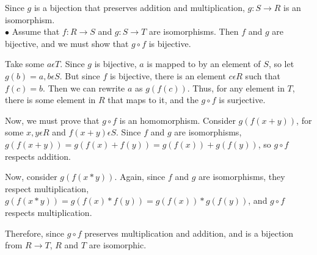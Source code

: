 \documentclass[a4paper,11pt]{article}
\begin{document}
Since $g$ is a bijection that preserves addition and multiplication, $g: S \rightarrow R$ is an isomorphism.\\

$\bullet$ Assume that $f: R \rightarrow S$ and $g: S \rightarrow T$ are isomorphisms. Then $f$ and $g$ are bijective, and we must show that $g \circ f$ is bijective.

Take some $a \epsilon T$. Since $g$ is bijective, $a$ is mapped to by an element of $S$, so let $g(b) = a, b \epsilon S$. But since $f$ is bijective, there is an element $c \epsilon R$ such that $f(c) = b$. Then we can rewrite $a$ as $g(f(c))$. Thus, for any element in $T$, there is some element in $R$ that maps to it, and the $g \circ f$ is surjective.

Now, we must prove that $g\circ f$ is an homomorphism. Consider $g(f(x+y))$, for some $x,y\epsilon R$ and $f(x+y)\epsilon S$. Since $f$ and $g$ are isomorphisms, $g(f(x+y)) = g(f(x)+f(y)) = g(f(x)) + g(f(y))$, so $g\circ f$ respects addition. 

Now, consider $g(f(x*y))$. Again, since $f$ and $g$ are isomorphisms, they respect multiplication, $g(f(x*y)) = g(f(x)*f(y)) = g(f(x)) * g(f(y))$, and $g\circ f$ respects multiplication.

Therefore, since $g \circ f$ preserves multiplication and addition, and is a bijection from $R \rightarrow T$, $R$ and $T$ are isomorphic.
\end{document}
